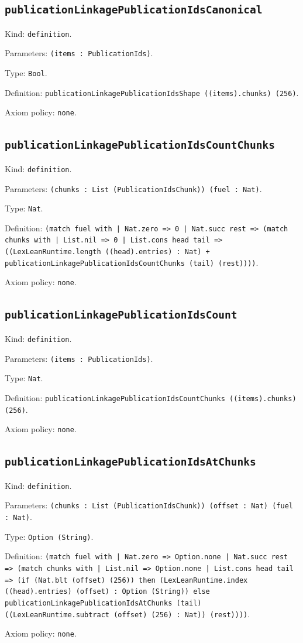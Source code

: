 \documentclass[11pt]{article}
\begin{document}
\subsection*{\texttt{publicationLinkagePublicationIdsCanonical}}
\noindent Kind: \texttt{definition}.\par
\noindent Parameters: \texttt{(items : PublicationIds)}.\par
\noindent Type: \texttt{Bool}.\par
\noindent Definition: \texttt{publicationLinkagePublicationIdsShape ((items).chunks) (256)}.\par
\noindent Axiom policy: \texttt{none}.\par
\subsection*{\texttt{publicationLinkagePublicationIdsCountChunks}}
\noindent Kind: \texttt{definition}.\par
\noindent Parameters: \texttt{(chunks : List (PublicationIdsChunk)) (fuel : Nat)}.\par
\noindent Type: \texttt{Nat}.\par
\noindent Definition: \texttt{(match fuel with | Nat.zero => 0 | Nat.succ rest => (match chunks with | List.nil => 0 | List.cons head tail => ((LexLeanRuntime.length ((head).entries) : Nat) + publicationLinkagePublicationIdsCountChunks (tail) (rest))))}.\par
\noindent Axiom policy: \texttt{none}.\par
\subsection*{\texttt{publicationLinkagePublicationIdsCount}}
\noindent Kind: \texttt{definition}.\par
\noindent Parameters: \texttt{(items : PublicationIds)}.\par
\noindent Type: \texttt{Nat}.\par
\noindent Definition: \texttt{publicationLinkagePublicationIdsCountChunks ((items).chunks) (256)}.\par
\noindent Axiom policy: \texttt{none}.\par
\subsection*{\texttt{publicationLinkagePublicationIdsAtChunks}}
\noindent Kind: \texttt{definition}.\par
\noindent Parameters: \texttt{(chunks : List (PublicationIdsChunk)) (offset : Nat) (fuel : Nat)}.\par
\noindent Type: \texttt{Option (String)}.\par
\noindent Definition: \texttt{(match fuel with | Nat.zero => Option.none | Nat.succ rest => (match chunks with | List.nil => Option.none | List.cons head tail => (if (Nat.blt (offset) (256)) then (LexLeanRuntime.index ((head).entries) (offset) : Option (String)) else publicationLinkagePublicationIdsAtChunks (tail) ((LexLeanRuntime.subtract (offset) (256) : Nat)) (rest))))}.\par
\noindent Axiom policy: \texttt{none}.\par
\end{document}
